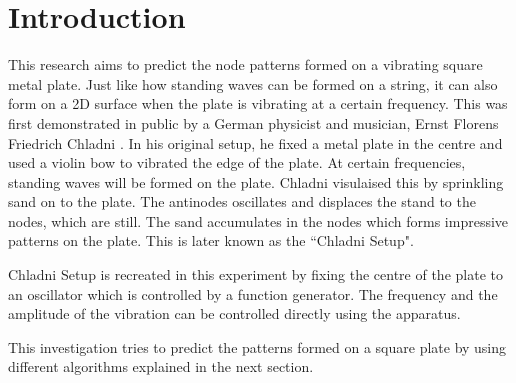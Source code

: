 \section{Introduction}
This research aims to predict the node patterns formed on a vibrating square metal plate. Just like how standing waves can be formed on a string, it can also form on a 2D surface when the plate is vibrating at a certain frequency. This was first demonstrated in public by a German physicist and musician, Ernst Florens Friedrich Chladni \autocite{harvard_chladni}. In his original setup, he fixed a metal plate in the centre and used a violin bow to vibrated the edge of the plate. At certain frequencies, standing waves will be formed on the plate. Chladni visulaised this by sprinkling sand on to the plate. The antinodes oscillates and displaces the stand to the nodes, which are still. The sand accumulates in the nodes which forms impressive patterns on the plate. This is later known as the ``Chladni Setup".

Chladni Setup is recreated in this experiment by fixing the centre of the plate to an oscillator which is controlled by a function generator. The frequency and the amplitude of the vibration can be controlled directly using the apparatus.

This investigation tries to predict the patterns formed on a square plate by using different algorithms explained in the next section.